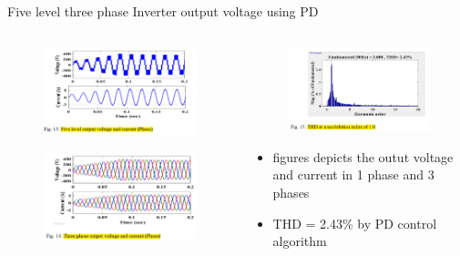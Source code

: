 \documentclass[
	11pt, %
]{beamer}
\begin{document}
\begin{frame}{Five level three phase Inverter output voltage using PD}
	\begin{columns}
	\begin{column}{0.5\textwidth}
		\begin{figure}
			\includegraphics[width=0.8\linewidth]{PD_V_C.png}
		\end{figure}
		\begin{figure}
			\includegraphics[width=0.8\linewidth]{PD_V_C_3.png}
		\end{figure}
	\end{column}
	\begin{column}{0.5\textwidth}
		\begin{figure}
			\includegraphics[width=1\linewidth]{PD_THD.png}
		\end{figure}
		\begin{itemize}
			\scriptsize
			\item {figures depicts the outut voltage and current in 1 phase and 3 phases}
			\item {THD = 2.43\% by PD control algorithm}
		\end{itemize}
	\end{column}
  \end{columns}
\end{frame}
\end{document}
